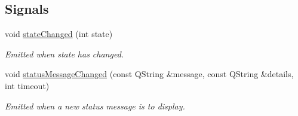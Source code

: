 \subsection*{Signals}
\begin{DoxyCompactItemize}
\item 
void \hyperlink{classmdt_device_aecd2d9d2cc3665f2084d0fd20eb3db2d}{stateChanged} (int state)
\begin{DoxyCompactList}\small\item\em Emitted when state has changed. \end{DoxyCompactList}\item 
void \hyperlink{classmdt_device_a3fbc6e71241e2e9daa2d8557f870c03c}{statusMessageChanged} (const QString \&message, const QString \&details, int timeout)
\begin{DoxyCompactList}\small\item\em Emitted when a new status message is to display. \end{DoxyCompactList}\end{DoxyCompactItemize}
